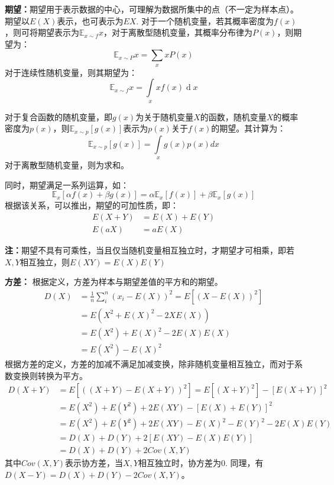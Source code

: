 \documentclass[12pt,a4paper]{article}
\begin{document}
  \textbf{期望：}期望用于表示数据的中心，可理解为数据所集中的点（不一定为样本点）。期望以$E(X)$表示，也可表示为$EX$. 对于一个随机变量，若其概率密度为$f(x)$，则可将期望表示为$\mathbb{E}_{x\sim f}x$，对于离散型随机变量，其概率分布律为$P(x)$，则期望为：
  \begin{equation}
  \mathbb{E}_{x\sim P} x = \sum\limits_x xP(x)
  \label{eq:ex_1}
  \end{equation}
  对于连续性随机变量，则其期望为：
  \begin{equation}
    \mathbb{E}_{x \sim f} x = \int \limits _x x f(x) \operatorname{d}x
    \label{eq:ex_2}
  \end{equation}

  对于复合函数的随机变量，即$g(x)$为关于随机变量$X$的函数，随机变量$X$的概率密度为$p(x)$，则$\mathbb{E}_{x\sim p}\left[g(x)\right]$表示为$p(x)$关于$f(x)$的期望。其计算为：
  $$
  \mathbb{E}_{x\sim p}\left[g(x)\right] = \int \limits _x g(x)p(x)dx
  $$
  对于离散型随机变量，则为求和。

  同时，期望满足一系列运算，如：
  $$
  \mathbb{E}_x \left[\alpha f(x) + \beta g(x)\right] = \alpha \mathbb{E}_x [f(x)] + \beta \mathbb{E}_x [g(x)]
  $$
  根据该关系，可以推出，期望的可加性质，即：
  $$
    \begin{aligned}
       E(X+Y) &= E(X) + E(Y) \\ 
       E(aX) & = aE(X)
    \end{aligned}
  $$

  \textbf{注：}期望不具有可乘性，当且仅当随机变量相互独立时，才期望才可相乘，即若$X,Y$相互独立，则$E(XY)=E(X)E(Y)$

  \textbf{方差：} 根据定义，方差为样本与期望差值的平方和的期望。
  $$
  \begin{aligned}
    D(X) &= \frac{1}{n}\sum\limits _i^n (x_i - E(X))^2 = E[(X-E(X))^2] \\ 
    &= E(X^2 + E(X)^2-2XE(X)) \\ 
    &= E(X^2) + E(X)^2 - 2E(X)E(X) \\ 
    &= E(X^2) - E(X)^2
  \end{aligned}
  $$
  根据方差的定义，方差的加减不满足加减变换，除非随机变量相互独立，而对于系数变换则转换为平方。
  $$
  \begin{aligned}
    D(X+Y) &= E[((X+Y)-E(X+Y))^2] = E[(X+Y)^2] - [E(X+Y)]^2 \\ 
    &= E(X^2)+E(Y^2)+2E(XY)-[E(X)+E(Y)]^2 \\ 
    &= E(X^2)+E(Y^2)+2E(XY)-E(X)^2-E(Y)^2-2E(X)E(Y) \\ 
    &=D(X)+D(Y) + 2[E(XY)-E(X)E(Y)] \\ &= D(X)+D(Y)+2C o v(X,Y)
  \end{aligned}
  $$
  其中$Cov(X,Y)$表示协方差，当$X,Y$相互独立时，协方差为0. 同理，有$D(X-Y)=D(X)+D(Y)-2Cov(X,Y)$。
\end{document}
